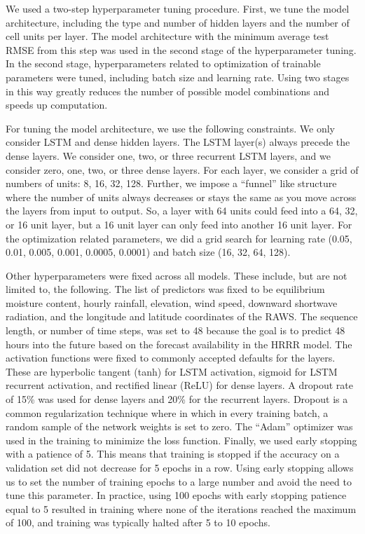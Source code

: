 \documentclass[fire,article,submit,pdftex,moreauthors]{Definitions/mdpi}
\begin{document}
We used a two-step hyperparameter tuning procedure. First, we tune the model architecture, including the type and number of hidden layers and the number of cell units per layer. The model architecture with the minimum average test RMSE from this step was used in the second stage of the hyperparameter tuning. In the second stage, hyperparameters related to optimization of trainable parameters were tuned, including batch size and learning rate. Using two stages in this way greatly reduces the number of possible model combinations and speeds up computation. 

For tuning the model architecture, we use the following constraints. We only consider LSTM and dense hidden layers. The LSTM layer(s) always precede the dense layers. We consider one, two, or three recurrent LSTM layers, and we consider zero, one, two, or three dense layers. For each layer, we consider a grid of numbers of units: 8, 16, 32, 128. Further, we impose a ``funnel'' like structure where the number of units always decreases or stays the same as you move across the layers from input to output. So, a layer with 64 units could feed into a 64, 32, or 16 unit layer, but a 16 unit layer can only feed into another 16 unit layer. For the optimization related parameters, we did a grid search for learning rate (0.05, 0.01, 0.005, 0.001, 0.0005, 0.0001) and batch size (16, 32, 64, 128). 

Other hyperparameters were fixed across all models. These include, but are not limited to, the following. The list of predictors was fixed to be equilibrium moisture content, hourly rainfall, elevation, wind speed, downward shortwave radiation, and the longitude and latitude coordinates of the RAWS. The sequence length, or number of time steps, was set to 48 because the goal is to predict 48 hours into the future based on the forecast availability in the HRRR model. The activation functions were fixed to commonly accepted defaults for the layers. These are hyperbolic tangent (tanh) for LSTM activation, sigmoid for LSTM recurrent activation, and rectified linear (ReLU) for dense layers. A dropout rate of 15\% was used for dense layers and 20\% for the recurrent layers. Dropout is a common regularization technique where in which in every training batch, a random sample of the network weights is set to zero. The ``Adam'' optimizer was used in the training to minimize the loss function. Finally, we used early stopping with a patience of 5. This means that training is stopped if the accuracy on a validation set did not decrease for 5 epochs in a row. Using early stopping allows us to set the number of training epochs to a large number and avoid the need to tune this parameter. In practice, using 100 epochs with early stopping patience equal to 5 resulted in training where none of the iterations reached the maximum of 100, and training was typically halted after 5 to 10 epochs. 
\end{document}
